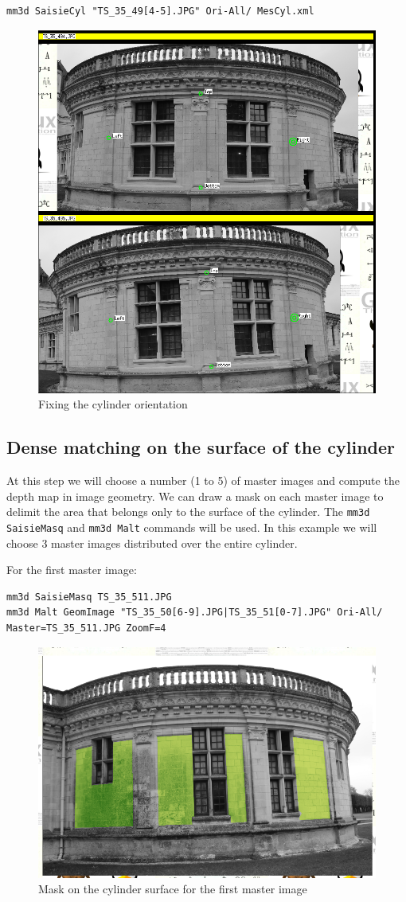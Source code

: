 \begin{verbatim}
mm3d SaisieCyl "TS_35_49[4-5].JPG" Ori-All/ MesCyl.xml
\end{verbatim}

\begin{figure}[H]
    \begin{center}
    \setlength{\unitlength}{0.5cm}
    \includegraphics[width=0.4\linewidth]{FIGS/ChambordTower/SaisieCyl_chambord_tower.png}
    \end{center}
    \caption{Fixing the cylinder orientation}
    \label{fig:saisiecyl}
\end{figure}

\subsection{Dense matching on the surface of the cylinder}
At this step we will choose a number (1 to 5) of master images and compute the depth map in image geometry. We can draw a mask on each master image to delimit the area that belongs only to the surface of the cylinder. The {\tt mm3d SaisieMasq} and {\tt mm3d Malt} commands will be used. In this example we will choose 3 master images distributed over the entire cylinder.\newline

For the first master image:
\begin{verbatim}
mm3d SaisieMasq TS_35_511.JPG
mm3d Malt GeomImage "TS_35_50[6-9].JPG|TS_35_51[0-7].JPG" Ori-All/ Master=TS_35_511.JPG ZoomF=4
\end{verbatim}

\begin{figure}[H]
    \begin{center}
    \setlength{\unitlength}{0.5cm}
    \includegraphics[width=0.4\linewidth]{FIGS/ChambordTower/masq_m1_chambord_tower.png}
    \end{center}
    \caption{Mask on the cylinder surface for the first master image}
    \label{fig:maskImg1}
\end{figure}

